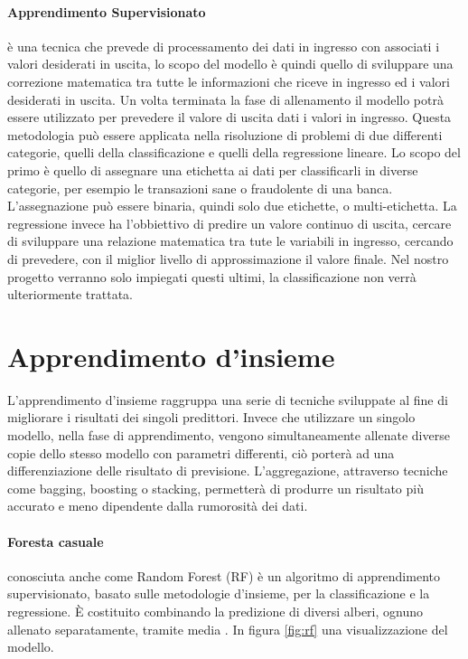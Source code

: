 \documentclass[%
    corpo=12pt,
    twoside,
    oldstyle,
    autoretitolo,
    greek,
    evenboxes,
]{toptesi}
\begin{document}
\paragraph{Apprendimento Supervisionato}
è una tecnica che prevede di processamento dei dati in ingresso con associati i valori desiderati in uscita, lo scopo del modello è quindi quello di sviluppare una correzione matematica tra tutte le informazioni che riceve in ingresso ed i valori desiderati in uscita. Un volta terminata la fase di allenamento il modello potrà essere utilizzato per prevedere il valore di uscita dati i valori in ingresso. Questa metodologia può essere applicata nella risoluzione di problemi di due differenti categorie, quelli della classificazione e quelli della regressione lineare. Lo scopo del primo è quello di assegnare una etichetta ai dati per classificarli in diverse categorie, per esempio le transazioni sane o fraudolente di una banca. L'assegnazione può essere binaria, quindi solo due etichette, o multi-etichetta. La regressione invece ha l'obbiettivo di predire un valore continuo di uscita, cercare di sviluppare una relazione matematica tra tute le variabili in ingresso, cercando di prevedere, con il miglior livello di approssimazione il valore finale. Nel nostro progetto verranno solo impiegati questi ultimi, la classificazione non verrà ulteriormente trattata.

\section{Apprendimento d'insieme}
L'apprendimento d'insieme raggruppa una serie di tecniche sviluppate al fine di migliorare i risultati dei singoli predittori. Invece che utilizzare un singolo modello, nella fase di apprendimento, vengono simultaneamente allenate diverse copie dello stesso modello con parametri differenti, ciò porterà ad una differenziazione delle risultato di previsione. L'aggregazione, attraverso tecniche come bagging, boosting o stacking, permetterà di produrre un risultato più accurato e meno dipendente dalla rumorosità dei dati.

\paragraph{Foresta casuale}
conosciuta anche come Random Forest (RF) è un algoritmo di apprendimento supervisionato, basato sulle metodologie d'insieme, per la classificazione e la regressione. È costituito combinando la predizione di diversi alberi, ognuno allenato separatamente, tramite media \cite{RF_theory}. In figura \ref{fig:rf} una visualizzazione del modello.
\end{document}
